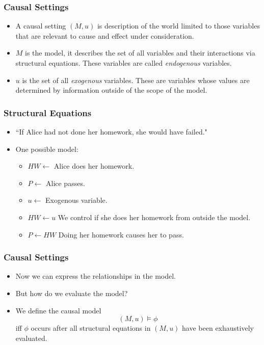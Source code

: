 \documentclass{beamer}
\theoremstyle{plain}
\theoremstyle{definition}
\begin{document}
\begin{frame}
\frametitle{Causal Settings}
\begin{itemize}
\item A causal setting $(M,u)$ is description of the world limited to those variables that are relevant to cause and effect under consideration.
\item $M$ is the model, it describes the set of all variables and their interactions via structural equations. These variables are called \textit{endogenous} variables.
\item $u$ is the set of all \textit{exogenous} variables. These are variables whose values are determined by information outside of the scope of the model.

\end{itemize}


\end{frame}


\begin{frame}
\frametitle{Structural Equations}
\begin{itemize}
\item ``If Alice had not done her homework, she would have failed."
\item One possible model: 
\begin{itemize}
\item $HW \leftarrow$ Alice does her homework.
\item $P \leftarrow$ Alice passes.
\item $u \leftarrow$ Exogenous variable.
\item $HW \leftarrow u$ We control if she does her homework from outside the model.
\item $P \leftarrow HW$ Doing her homework causes her to pass.
\end{itemize}

\end{itemize}
\end{frame}


\begin{frame}
\frametitle{Causal Settings}

\begin{itemize}

\item Now we can express the relationships in the model.
\item But how do we evaluate the model?
\item We define the causal model
\[
(M,u) \models \phi
\] iff $\phi$ occurs after all structural equations in $(M,u)$ have been exhaustively evaluated.

\end{itemize}

\end{frame}
\end{document}
